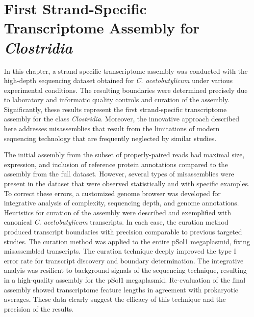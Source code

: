 




\section{First Strand-Specific Transcriptome Assembly for \itshape Clostridia}

In this chapter, a strand-specific transcriptome assembly was conducted with the high-depth sequencing dataset obtained for \textit{C. acetobutylicum} under various experimental conditions. The resulting boundaries were determined precisely due to laboratory and informatic quality controls and curation of the assembly. Significantly, these results represent the first strand-specific transcriptome assembly for the class \textit{Clostridia}. Moreover, the innovative approach described here addresses misassemblies that result from the limitations of modern sequencing technology that are frequently neglected by similar studies.

The initial assembly from the subset of properly-paired reads had maximal size, expression, and inclusion of reference protein annotations compared to the assembly from the full dataset. However, several types of misassemblies were present in the dataset that were observed statistically and with specific examples. To correct these errors, a customized genome browser was developed for integrative analysis of complexity, sequencing depth, and genome annotations. Heuristics for curation of the assembly were described and exemplified with canonical \textit{C. acetobutylicum} transcripts. In each case, the curation method produced transcript boundaries with precision comparable to previous targeted studies. The curation method was applied to the entire pSol1 megaplasmid, fixing misassembled transcripts. The curation technique deeply improved the type I error rate for transcript discovery and boundary determination. The integrative analyis was resilient to background signals of the sequencing technique, resulting in a high-quality assembly for the pSol1 megaplasmid. Re-evaluation of the final assembly showed transcriptome feature lengths in agreement with prokaryotic averages. These data clearly suggest the efficacy of this technique and the precision of the results.
